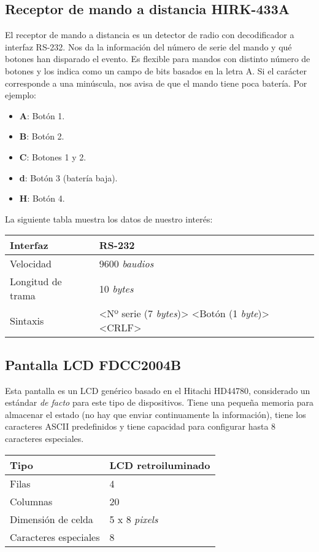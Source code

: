 \subsection{Receptor de mando a distancia HIRK-433A}

El receptor de mando a distancia es un detector de radio con decodificador a interfaz RS-232. Nos da la información del número de serie del mando y qué botones han disparado el evento. Es flexible para mandos con distinto número de botones y los indica como un campo de bits basados en la letra A. Si el carácter corresponde a una minúscula, nos avisa de que el mando tiene poca batería. Por ejemplo:

\begin{itemize}
	\item \textbf{A}: Botón 1.
	\item \textbf{B}: Botón 2.
	\item \textbf{C}: Botones 1 y 2.
	\item \textbf{d}: Botón 3 (batería baja).
	\item \textbf{H}: Botón 4.
\end{itemize}

La siguiente tabla muestra los datos de nuestro interés:

\begin{center}
	\begin{tabular}{|l|l|}
		\hline Interfaz & RS-232 \\
		\hline Velocidad & 9600 \textit{baudios} \\ 
		\hline Longitud de trama & 10 \textit{bytes} \\ 
		\hline Sintaxis & <Nº serie (7 \textit{bytes})> <Botón (1 \textit{byte})> <CRLF> \\ 
		\hline 
	\end{tabular} 
\end{center}

\subsection{Pantalla LCD FDCC2004B}

Esta pantalla es un LCD genérico basado en el Hitachi HD44780, considerado un estándar \textit{de facto} para este tipo de dispositivos. Tiene una pequeña memoria para almacenar el estado (no hay que enviar continuamente la información), tiene los caracteres ASCII predefinidos y tiene capacidad para configurar hasta 8 caracteres especiales.

\begin{center}
	\begin{tabular}{|l|l|}
		\hline Tipo & LCD retroiluminado \\ 
		\hline Filas & 4 \\ 
		\hline Columnas & 20 \\ 
		\hline Dimensión de celda & 5 x 8 \textit{pixels} \\ 
		\hline Caracteres especiales & 8 \\ 
		\hline 
	\end{tabular} 
\end{center} 

